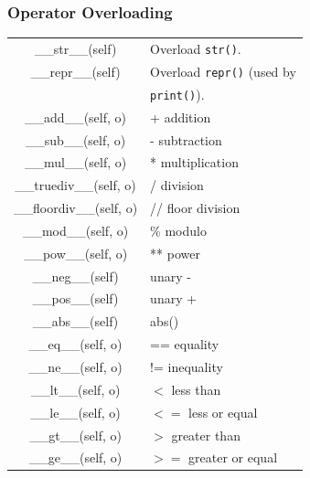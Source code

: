 \documentclass[5pt]{article}
\begin{document}
\begin{multicols}{2}
\subsubsection{Operator Overloading}
\begin{tabular}{C L}
    \_\_str\_\_(self)           & Overload \texttt{str()}.\\
    \_\_repr\_\_(self)          & Overload \texttt{repr()} (used by\\
                                & \texttt{print()}).\\
    \_\_add\_\_(self, o)        & + addition\\
    \_\_sub\_\_(self, o)        & - subtraction\\
    \_\_mul\_\_(self, o)        & * multiplication\\
    \_\_truediv\_\_(self, o)    & / division\\
    \_\_floordiv\_\_(self, o)   & // floor division\\
    \_\_mod\_\_(self, o)        & \% modulo\\
    \_\_pow\_\_(self, o)        & ** power\\
    \_\_neg\_\_(self)           & unary -\\
    \_\_pos\_\_(self)           & unary +\\
    \_\_abs\_\_(self)           & abs()\\
    \_\_eq\_\_(self, o)         & == equality\\
    \_\_ne\_\_(self, o)         & != inequality\\
    \_\_lt\_\_(self, o)         & $<$ less than\\
    \_\_le\_\_(self, o)         & $<=$ less or equal\\
    \_\_gt\_\_(self, o)         & $>$ greater than\\
    \_\_ge\_\_(self, o)         & $>=$ greater or equal\\
\end{tabular}


\end{multicols}
\end{document}
